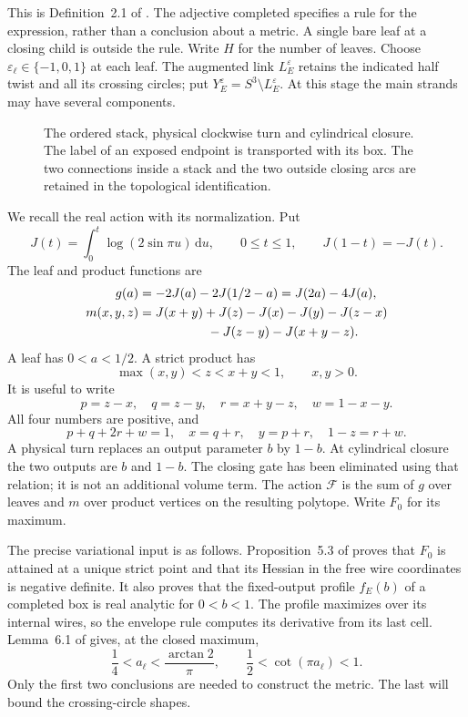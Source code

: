 \documentclass[11pt]{article}
\numberwithin{equation}{section}
\theoremstyle{definition}\newtheorem{definition}[theorem]{Definition}
\theoremstyle{remark}\newtheorem{remark}[theorem]{Remark}
\newcommand{\dd}{\mathrm d}
\newcommand{\eps}{\varepsilon}
\begin{document}
This is Definition~2.1 of \cite{Newton}. The adjective completed
specifies a rule for the expression, rather than a conclusion about
a metric. A single bare leaf at a closing child is outside the rule.
Write $H$ for the number of leaves.
Choose $\eps_\ell\in\{-1,0,1\}$ at each leaf. The augmented link
$L^\eps_E$ retains the indicated half twist and all its crossing
circles; put $Y^\eps_E=S^3\setminus L^\eps_E$. At this stage the main
strands may have several components.

\begin{figure}[ht]
\centering
\caption{The ordered stack, physical clockwise turn and cylindrical
closure. The label of an exposed endpoint is transported with its
box. The two connections inside a stack and the two outside closing
arcs are retained in the topological identification.}
\label{cg:fig-operations}
\end{figure}

We recall the real action with its normalization. Put
\[
 J(t)=\int_0^t\log(2\sin\pi u)\,\dd u,\qquad 0\le t\le1,
 \qquad J(1-t)=-J(t).
\]
The leaf and product functions are
\begin{align}
 g(a)&=-2J(a)-2J(1/2-a)=J(2a)-4J(a),\label{cg:g}\\
 m(x,y,z)&=J(x+y)+J(z)-J(x)-J(y)-J(z-x)\notag\\
 &\hspace{19mm}-J(z-y)-J(x+y-z).\label{cg:m}
\end{align}
A leaf has $0<a<1/2$. A strict product has
\begin{equation}\label{cg:strict}
 \max(x,y)<z<x+y<1,\qquad x,y>0.
\end{equation}
It is useful to write
\begin{equation}\label{cg:pqrw}
 p=z-x,\quad q=z-y,\quad r=x+y-z,\quad w=1-x-y.
\end{equation}
All four numbers are positive, and
\[
 p+q+2r+w=1,\quad x=q+r,\quad y=p+r,\quad 1-z=r+w.
\]
A physical turn replaces an output parameter $b$ by $1-b$.
At cylindrical closure the two outputs are $b$ and $1-b$.
The closing gate has been eliminated using that relation; it is not
an additional volume term. The action $\mathcal F$ is the sum of
$g$ over leaves and $m$ over product vertices on the resulting
polytope. Write $F_0$ for its maximum.

The precise variational input is as follows.
Proposition~5.3 of \cite{Newton} proves that $F_0$ is attained
at a unique strict point and that its Hessian in the free wire
coordinates is negative definite. It also proves that the fixed-output
profile $f_E(b)$ of a completed box is real analytic for $0<b<1$.
The profile maximizes over its internal wires, so the envelope
rule computes its derivative from its last cell. Lemma~6.1
of \cite{Newton} gives, at the closed maximum,
\begin{equation}\label{cg:leaf-window}
 \frac14<a_\ell<\frac{\arctan2}{\pi},
 \qquad \frac12<\cot(\pi a_\ell)<1 .
\end{equation}
Only the first two conclusions are needed to construct the metric.
The last will bound the crossing-circle shapes.
\end{document}
